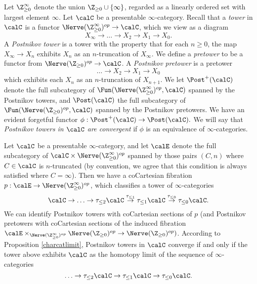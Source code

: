 \begin{definition}\label{postit1}
Let $\Z_{\geq 0}^{\infty}$ denote the union $\Z_{\geq 0} \cup \{ \infty \}$, regarded as a linearly ordered
set with largest element $\infty$. Let $\calC$ be a presentable $\infty$-category. Recall that
a {\it tower} in $\calC$ is a functor $\Nerve( \Z_{\geq 0}^{\infty})^{op} \rightarrow \calC$, which we view as a diagram
$$ X_{\infty} \rightarrow \ldots \rightarrow X_{2} \rightarrow X_{1} \rightarrow X_{0}.$$
A {\it Postnikov tower} is a tower with the property that for each $n \geq 0$, the map
$X_{\infty} \rightarrow X_{n}$ exhibits $X_{n}$ as an $n$-truncation of $X_{\infty}$. 
We define a {\it pretower} to be a functor from $\Nerve( \Z_{\geq 0})^{op} \rightarrow \calC$.
A {\it Postnikov pretower} is a pretower
$$ \ldots \rightarrow X_{2} \rightarrow X_{1} \rightarrow X_0$$
which exhibits each $X_{n}$ as an $n$-truncation of $X_{n+1}$.
We let $\Post^{+}(\calC)$ denote the full subcategory of $\Fun( \Nerve( \Z_{\geq 0}^{\infty})^{op}, \calC)$
spanned by the Postnikov towers, and $\Post(\calC)$ the full subcategory of
$\Fun( \Nerve(\Z_{\geq 0})^{op}, \calC)$ spanned by the Postnikov pretowers.
We have an evident forgetful functor
$\phi: \Post^{+}(\calC) \rightarrow \Post(\calC).$ We will say that
{\it Postnikov towers in $\calC$ are convergent} if $\phi$ is an equivalence of $\infty$-categories.
\end{definition}

\begin{remark}\label{sumptime}
Let $\calC$ be a presentable $\infty$-category, and let
$\calE$ denote the full subcategory of $\calC \times \Nerve( \Z^{\infty}_{\geq 0})^{op}$
spanned by those pairs $(C, n)$ where $C \in \calC$ is $n$-truncated (by convention, we agree that
this condition is always satisfied where $C = \infty$). Then we have a coCartesian fibration
$p: \calE \rightarrow \Nerve( \Z^{\infty}_{\geq 0})^{op}$, which classifies a tower of $\infty$-categories
$$ \calC \rightarrow \ldots \rightarrow \tau_{\leq 2} \calC \stackrel{\tau_{\leq 1}}{\rightarrow} \tau_{\leq 1} \calC
\stackrel{\tau_{\leq 0}}{\rightarrow} \tau_{\leq 0} \calC.$$
We can identify Postnikov towers with coCartesian sections of $p$ (and Postnikov pretowers
with coCartesian sections of the induced fibration
$\calE \times_{ \Nerve( \Z^{\infty}_{\geq 0})^{op}} \Nerve(\Z_{\geq 0})^{op}
\rightarrow \Nerve( \Z_{\geq 0})^{op})$.
According to Proposition \ref{charcatlimit}, Postnikov towers in $\calC$ converge if and only if
the tower above exhibits $\calC$ as the homotopy limit of the sequence of $\infty$-categories
$$ \ldots \rightarrow \tau_{\leq 2} \calC \rightarrow \tau_{\leq 1} \calC \rightarrow
\tau_{\leq 0} \calC.$$
\end{remark}

